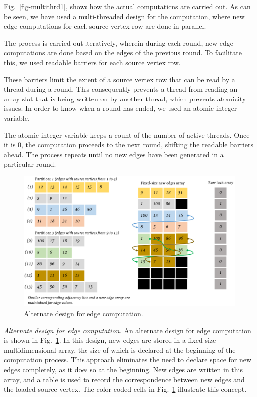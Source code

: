 \documentclass[10pt,preprint]{sigplanconf}
\begin{document}
Fig.~\ref{fig-multithrd1}, shows how the actual computations are carried out. As can be seen, we have used a multi-threaded design for the computation, where new edge computations for each source vertex row are done in-parallel. 

The process is carried out iteratively, wherein during each round, new edge computations are done based on the edges of the previous round. To facilitate this, we used readable barriers for each source vertex row. 

These barriers limit the extent of a source vertex row that can be read by a thread during a round. This consequently prevents a thread from reading an array slot that is being written on by another thread, which prevents atomicity issues. In order to know when a round has ended, we used an atomic integer variable. 

The atomic integer variable keeps a count of the number of active threads. Once it is 0, the computation proceeds to the next round, shifting the readable barriers ahead. The process repeats until no new edges have been generated in a particular round.

\begin{figure}[!htbp]
	\begin{center}
		\includegraphics[scale=0.6]{Figures/alt.pdf}
	\end{center}
	\caption{Alternate design for edge computation.}
	\label{fig-alt}
\end{figure} 

\textit{Alternate design for edge computation.} An alternate design for edge computation is shown in Fig.~\ref{fig-alt}. In this design, new edges are stored in a fixed-size multidimensional array, the size of which is declared at the beginning of the computation process. This approach eliminates the need to declare space for new edges completely, as it does so at the beginning. New edges are written in this array, and a table is used to record the correspondence between new edges and the loaded source vertex. The color coded cells in Fig.~\ref{fig-alt} illustrate this concept.
\end{document}

